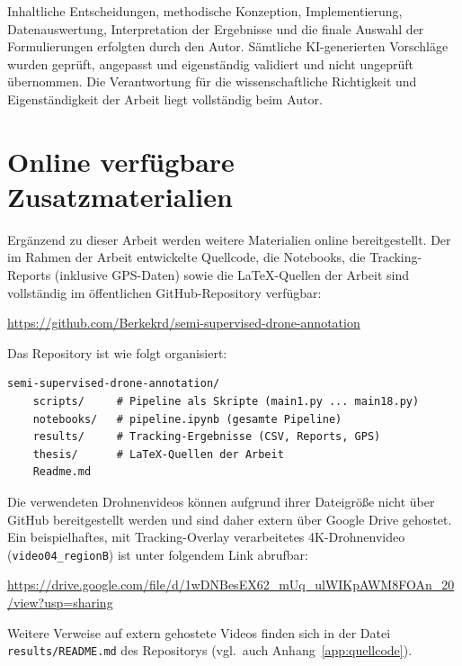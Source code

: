 Inhaltliche Entscheidungen, methodische Konzeption, Implementierung,
Datenauswertung, Interpretation der Ergebnisse und die finale Auswahl der
Formulierungen erfolgten durch den Autor. Sämtliche KI-generierten Vorschläge
wurden geprüft, angepasst und eigenständig validiert und nicht ungeprüft
übernommen. Die Verantwortung für die wissenschaftliche Richtigkeit und
Eigenständigkeit der Arbeit liegt vollständig beim Autor.


\section*{Online verfügbare Zusatzmaterialien}

Ergänzend zu dieser Arbeit werden weitere Materialien online bereitgestellt. Der
im Rahmen der Arbeit entwickelte Quellcode, die Notebooks, die Tracking-Reports
(inklusive GPS-Daten) sowie die LaTeX-Quellen der Arbeit sind vollständig im
öffentlichen GitHub-Repository verfügbar:

\begin{center}
\url{https://github.com/Berkekrd/semi-supervised-drone-annotation}
\end{center}

\noindent
Das Repository ist wie folgt organisiert:

\begin{verbatim}
semi-supervised-drone-annotation/
    scripts/     # Pipeline als Skripte (main1.py ... main18.py)
    notebooks/   # pipeline.ipynb (gesamte Pipeline)
    results/     # Tracking-Ergebnisse (CSV, Reports, GPS)
    thesis/      # LaTeX-Quellen der Arbeit
    Readme.md
\end{verbatim}

Die verwendeten Drohnenvideos können aufgrund ihrer Dateigröße nicht über GitHub
bereitgestellt werden und sind daher extern über Google Drive gehostet. Ein
beispielhaftes, mit Tracking-Overlay verarbeitetes 4K-Drohnenvideo
(\texttt{video04\_regionB}) ist unter folgendem Link abrufbar:

\begin{center}
\url{https://drive.google.com/file/d/1wDNBesEX62_mUq_ulWIKpAWM8FOAn_20/view?usp=sharing}
\end{center}

\noindent
Weitere Verweise auf extern gehostete Videos finden sich in der Datei
\texttt{results/README.md} des Repositorys (vgl.\ auch Anhang~\ref{app:quellcode}).

